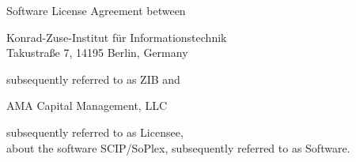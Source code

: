 \documentclass[12pt,a4paper]{article}
\date{October 24th, 2007}
\begin{document}


Software License Agreement between
\begin{center}
  Konrad-Zuse-Institut f\"ur Informationstechnik\\
  Takustra\ss{}e 7, 14195 Berlin, Germany\\
\end{center}
subsequently referred to as ZIB and
\begin{center}
  AMA Capital Management, LLC\\
\end{center}
subsequently referred to as Licensee,\\
about the software SCIP/SoPlex, subsequently referred to as Software.
\end{document}
